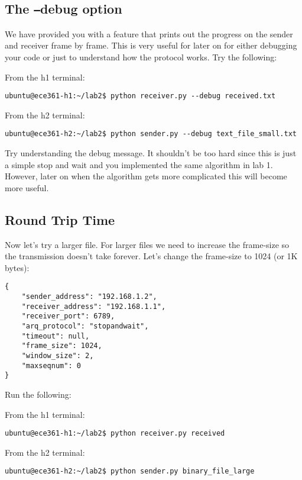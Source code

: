 \documentclass[11pt]{article}
\begin{document}

\subsection {The \texttt{--}debug option}
We have provided you with a feature that prints out the progress on the sender and receiver frame by frame. This is very useful for later on for either debugging your code or just to understand how the protocol works. Try the following:

From the h1 terminal:
\begin{lstlisting}[style=ece361shell, caption={}]
ubuntu@ece361-h1:~/lab2$ python receiver.py --debug received.txt
\end{lstlisting}
From the h2 terminal:
\begin{lstlisting}[style=ece361shell, caption={}]
ubuntu@ece361-h2:~/lab2$ python sender.py --debug text_file_small.txt
\end{lstlisting}

Try understanding the debug message. It shouldn't be too hard since this is just a simple stop and wait and you implemented the same algorithm in lab 1. However, later on when the algorithm gets more complicated this will become more useful.

\subsection{Round Trip Time}
Now let's try a larger file. For larger files we need to increase the frame-size so the transmission doesn't take forever. Let's change the frame-size to 1024 (or 1K bytes):
\begin{lstlisting}[caption={Configuration For Large File}]
{
    "sender_address": "192.168.1.2",
    "receiver_address": "192.168.1.1",
    "receiver_port": 6789,
    "arq_protocol": "stopandwait",
    "timeout": null,
    "frame_size": 1024,
    "window_size": 2,
    "maxseqnum": 0
}
\end{lstlisting}
Run the following:

From the h1 terminal:
\begin{lstlisting}[style=ece361shell, caption={}]
ubuntu@ece361-h1:~/lab2$ python receiver.py received
\end{lstlisting}
From the h2 terminal:
\begin{lstlisting}[style=ece361shell, caption={}]
ubuntu@ece361-h2:~/lab2$ python sender.py binary_file_large
\end{lstlisting}
\end{document}
